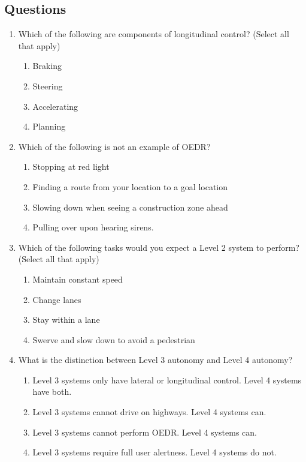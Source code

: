\subsection{Questions}
\label{introduction_self_driving_cars_questions}

\begin{enumerate}

\item Which of the following are components of longitudinal control? (Select all that apply)
\begin{enumerate}
\item Braking
\item Steering
\item Accelerating
\item Planning
\end{enumerate}

\item Which of the following is not an example of OEDR?

\begin{enumerate}
\item Stopping at red light
\item Finding a route from your location to a goal location
\item Slowing down when seeing a construction zone ahead
\item Pulling over upon hearing sirens.
\end{enumerate}

\item Which of the following tasks would you expect a Level 2 system to perform? (Select all that apply)

\begin{enumerate}
\item Maintain constant speed
\item Change lanes
\item Stay within a lane
\item Swerve and slow down to avoid a pedestrian
\end{enumerate}

\item What is the distinction between Level 3 autonomy and Level 4 autonomy? 


\begin{enumerate}
\item Level 3 systems only have lateral or longitudinal control. Level 4 systems have both.
\item Level 3 systems cannot drive on highways. Level 4 systems can.
\item Level 3 systems cannot perform OEDR. Level 4 systems can.
\item Level 3 systems require full user alertness. Level 4 systems do not.
\end{enumerate}


\end{enumerate}

